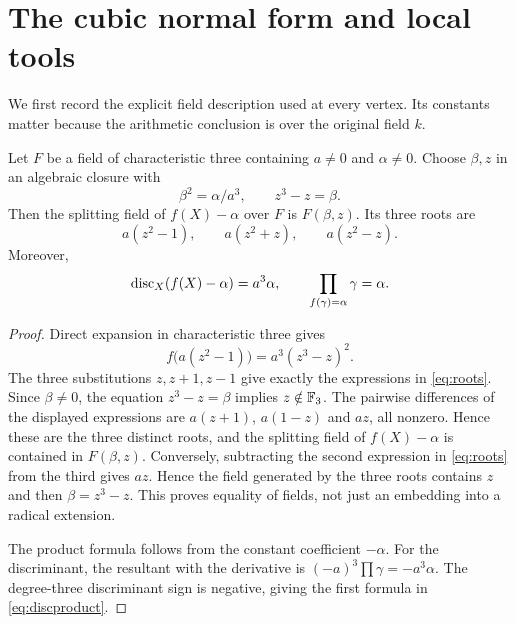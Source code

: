 \section{The cubic normal form and local tools}\label{sec:normal}

We first record the explicit field description used at every vertex.
Its constants matter because the arithmetic conclusion is over the
original field $k$.

\begin{lemma}\label{lem:normal}
Let $F$ be a field of characteristic three containing $a\neq0$ and
$\alpha\neq0$. Choose $\beta,z$ in an algebraic closure with
\[
 \beta^2=\alpha/a^3,\qquad z^3-z=\beta.
\]
Then the splitting field of $f(X)-\alpha$ over $F$ is $F(\beta,z)$.
Its three roots are
\begin{equation}\label{eq:roots}
 a(z^2-1),\qquad a(z^2+z),\qquad a(z^2-z).
\end{equation}
Moreover,
\begin{equation}\label{eq:discproduct}
 \operatorname{disc}_X(f(X)-\alpha)=a^3\alpha,
 \qquad \prod_{f(\gamma)=\alpha}\gamma=\alpha.
\end{equation}
\end{lemma}

\begin{proof}
Direct expansion in characteristic three gives
\begin{equation}\label{eq:normalidentity}
 f\bigl(a(z^2-1)\bigr)=a^3(z^3-z)^2.
\end{equation}
The three substitutions $z,z+1,z-1$ give exactly the expressions
in \eqref{eq:roots}. Since $\beta\neq0$, the equation
$z^3-z=\beta$ implies $z\notin\mathbb{F}_3$. The pairwise differences
of the displayed expressions are $a(z+1)$, $a(1-z)$ and $az$,
all nonzero. Hence these are the three distinct roots, and the
splitting field of $f(X)-\alpha$ is contained in $F(\beta,z)$.
Conversely, subtracting the second expression in \eqref{eq:roots}
from the third gives $az$. Hence the field generated by the three
roots contains $z$ and then $\beta=z^3-z$. This proves equality of
fields, not just an embedding into a radical extension.

The product formula follows from the constant coefficient $-\alpha$.
For the discriminant, the resultant with the derivative is
$(-a)^3\prod\gamma=-a^3\alpha$. The degree-three discriminant sign
is negative, giving the first formula in \eqref{eq:discproduct}.
\end{proof}

